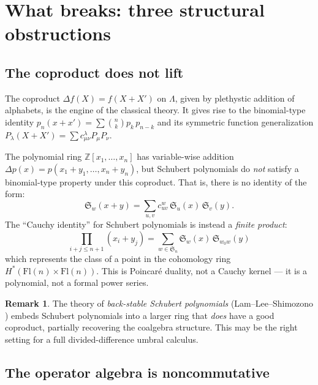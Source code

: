 \documentclass[11pt]{amsart}
\theoremstyle{definition}
\newtheorem{remark}[theorem]{Remark}
\newcommand{\Z}{\mathbb{Z}}
\newcommand{\fS}{\mathfrak{S}}
\begin{document}
\section{What breaks: three structural obstructions}

\subsection{The coproduct does not lift}\label{sec:coproduct}

The coproduct $\Delta f(X) = f(X + X')$ on $\Lambda$, given by
plethystic addition of alphabets, is the engine of the classical
theory. It gives rise to the binomial-type identity
$p_n(x + x') = \sum \binom{n}{k} p_k\, p_{n-k}$ and its symmetric
function generalization
$P_\lambda(X + X') = \sum c^\lambda_{\mu\nu} P_\mu P_\nu$.

The polynomial ring $\Z[x_1, \dots, x_n]$ has variable-wise
addition $\Delta p(x) = p(x_1 + y_1, \dots, x_n + y_n)$, but
Schubert polynomials do \emph{not} satisfy a binomial-type property
under this coproduct. That is, there is no identity of the form:
\[
  \mathfrak{S}_w(x + y) = \sum_{u,v} c^w_{uv}\, \mathfrak{S}_u(x)\,
  \mathfrak{S}_v(y).
\]
The ``Cauchy identity'' for Schubert polynomials is instead a
\emph{finite product}:
\[
  \prod_{i + j \leq n+1} (x_i + y_j) = \sum_{w \in \fS_n}
  \mathfrak{S}_w(x)\, \mathfrak{S}_{w_0 w}(y)
\]
which represents the class of a point in the cohomology ring
$H^*(\mathrm{Fl}(n) \times \mathrm{Fl}(n))$. This is Poincar\'e
duality, not a Cauchy kernel --- it is a polynomial, not a formal
power series.

\begin{remark}
  The theory of \emph{back-stable Schubert polynomials}
  (Lam--Lee--Shimozono \cite{LLS}) embeds Schubert polynomials into
  a larger ring that \emph{does} have a good coproduct, partially
  recovering the coalgebra structure. This may be the right setting
  for a full divided-difference umbral calculus.
\end{remark}

\subsection{The operator algebra is noncommutative}
\end{document}
